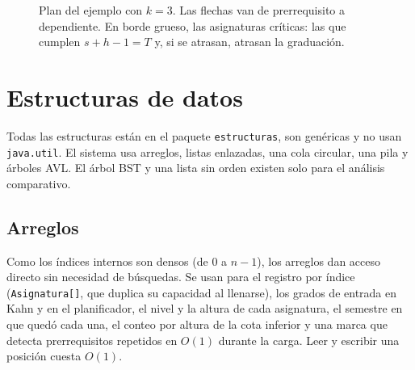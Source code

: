 \documentclass[11pt,letterpaper]{article}
\begin{document}
\begin{figure}[H]
\centering
{}
\caption{Plan del ejemplo con $k = 3$. Las flechas van de prerrequisito a dependiente. En borde grueso, las asignaturas críticas: las que cumplen $s + h - 1 = T$ y, si se atrasan, atrasan la graduación.}
\label{fig:ejemplo}
\end{figure}

\section{Estructuras de datos}\label{sec:estructuras}

Todas las estructuras están en el paquete \texttt{estructuras}, son genéricas y no usan \texttt{java.util}. El sistema usa arreglos, listas enlazadas, una cola circular, una pila y árboles AVL. El árbol BST y una lista sin orden existen solo para el análisis comparativo.

\subsection{Arreglos}
Como los índices internos son densos (de $0$ a $n - 1$), los arreglos dan acceso directo sin necesidad de búsquedas. Se usan para el registro por índice (\texttt{Asignatura[]}, que duplica su capacidad al llenarse), los grados de entrada en Kahn y en el planificador, el nivel y la altura de cada asignatura, el semestre en que quedó cada una, el conteo por altura de la cota inferior y una marca que detecta prerrequisitos repetidos en $O(1)$ durante la carga. Leer y escribir una posición cuesta $O(1)$.
\end{document}
